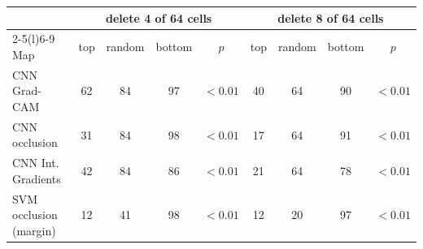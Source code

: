 \begin{tabular}{@{}lcccccccc@{}}\toprule
 & \multicolumn{4}{c}{delete 4 of 64 cells} & \multicolumn{4}{c}{delete 8 of 64 cells}\\
\cmidrule(lr){2-5}\cmidrule(l){6-9}
Map & top & random & bottom & $p$ & top & random & bottom & $p$\\\midrule
CNN Grad-CAM & 62 & 84 & 97 & $<0.01$ & 40 & 64 & 90 & $<0.01$ \\
CNN occlusion & 31 & 84 & 98 & $<0.01$ & 17 & 64 & 91 & $<0.01$ \\
CNN Int. Gradients & 42 & 84 & 86 & $<0.01$ & 21 & 64 & 78 & $<0.01$ \\
SVM occlusion (margin) & 12 & 41 & 98 & $<0.01$ & 12 & 20 & 97 & $<0.01$ \\
\bottomrule\end{tabular}
